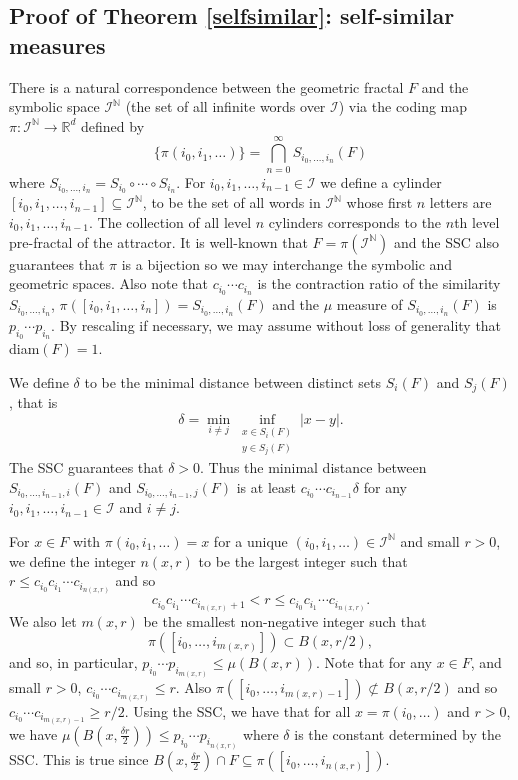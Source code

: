 \documentclass[12pt]{amsart}
\numberwithin{equation}{section}
\renewcommand{\ge}{\geqslant}
\renewcommand{\le}{\leqslant}
\renewcommand{\leq}{\leqslant}
\begin{document}
\subsection{Proof of Theorem \ref{selfsimilar}: self-similar measures} \label{self-similar}


There is a natural correspondence between the geometric fractal $F$ and the symbolic space $\mathcal{I}^{\mathbb{N}}$ (the set of all infinite words over $\mathcal{I}$) via the coding map $\pi \colon \mathcal{I}^{\mathbb{N}} \rightarrow \mathbb{R}^d$ defined by 
\[
\{\pi(i_0,i_1,\ldots) \} =  \bigcap_{n=0}^\infty S_{i_0,\ldots, i_n}(F)
\]
where $S_{i_0,\ldots, i_n} = S_{i_0} \circ \cdots \circ S_{ i_n}$.  For $ i_0,i_1,\ldots, i_{n-1} \in \mathcal{I}$ we define a cylinder $[i_0,i_1,\ldots, i_{n-1}] \subseteq \mathcal{I}^\mathbb{N}$, to be the set of all words in $\mathcal{I}^{\mathbb{N}}$ whose first $n$ letters are $i_0,i_1,\ldots, i_{n-1}$. The collection of all level $n$ cylinders corresponds to the  $n$th level  pre-fractal of the attractor.  It is well-known that $F= \pi(\mathcal{I}^\mathbb{N})$ and the SSC also guarantees that $\pi$ is a bijection so we may interchange the symbolic and geometric spaces.  Also note that  $c_{i_0}\cdots c_{i_{n}}$ is the contraction ratio of the similarity $S_{i_0,\ldots, i_n} $,  $\pi([i_0,i_1,\ldots, i_{n}] ) = S_{i_0,\ldots, i_n} (F)$ and the $\mu$ measure of $S_{i_0,\ldots, i_n} (F)$  is $p_{i_0}\cdots p_{i_{n}}$.  By rescaling if necessary, we may assume without loss of generality that diam$(F)=1$. 


We define $\delta$ to be the minimal distance between distinct  sets $S_i(F)$ and $S_j(F)$, that is 
\[
\delta= \min_{i\neq j} \inf_{\substack{x \in S_i(F) \\ y \in S_j(F)}} \lvert x-y \rvert.
\]
The SSC guarantees that $\delta > 0$. Thus the minimal distance between $S_{i_0,\ldots,i_{n-1},i}(F)$ and $S_{i_0,\ldots,i_{n-1},j}(F)$ is at least $c_{i_0}\cdots c_{i_{n-1}} \delta$ for any   $ i_0,i_1,\ldots, i_{n-1} \in \mathcal{I}$ and $i\neq j$.


For $x\in F$ with $\pi(i_0, i_1, \dots)=x$ for a unique $(i_0,i_1,\dots) \in \mathcal{I}^\mathbb{N}$ and small $r>0$, we define the integer $n(x,r)$ to be the largest integer such that $r \le c_{i_0}c_{i_1} \cdots c_{i_{n(x,r)}}$ and so
\[
c_{i_0}c_{i_1} \cdots c_{i_{n(x,r)}+1} < r \le c_{i_0}c_{i_1} \cdots c_{i_{n(x,r)}}.
\]
We also let $m(x,r)$ be the smallest non-negative  integer such that 
$$
\pi([i_0,\ldots, i_{m(x,r)}])\subset B(x,r/2),
$$
and so, in particular,  $p_{i_0}\cdots p_{i_{m(x,r)}} \le \mu (B(x,r))$.  Note that for any $x \in F$, and small $ r>0$,  $c_{i_0} \cdots c_{i_{m(x,r)}} \leq r$. Also  $\pi([i_0,\ldots, i_{m(x,r)-1}]) \not\subset B(x,r/2)$ and so $c_{i_0} \cdots c_{i_{m(x,r)-1}} \ge r/2$. Using the SSC, we have that for all $x=\pi(i_0,\ldots)$ and  $r>0$, we have $\mu(B(x,\frac{\delta r}{2}))\le p_{i_0}\cdots p_{i_{n(x,r)}}$ where $\delta$ is the constant determined by the SSC. This is true since $B(x, \frac{\delta r}{2}) \cap F  \subseteq \pi([i_0,\ldots, i_{n(x,r)}])$.
\end{document}
